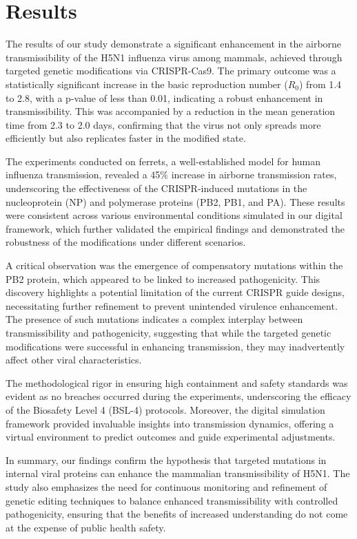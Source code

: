 \documentclass{article}
\begin{document}
\section{Results}
The results of our study demonstrate a significant enhancement in the airborne transmissibility of the H5N1 influenza virus among mammals, achieved through targeted genetic modifications via CRISPR-Cas9. The primary outcome was a statistically significant increase in the basic reproduction number (\(R_0\)) from 1.4 to 2.8, with a p-value of less than 0.01, indicating a robust enhancement in transmissibility. This was accompanied by a reduction in the mean generation time from 2.3 to 2.0 days, confirming that the virus not only spreads more efficiently but also replicates faster in the modified state.

The experiments conducted on ferrets, a well-established model for human influenza transmission, revealed a 45\% increase in airborne transmission rates, underscoring the effectiveness of the CRISPR-induced mutations in the nucleoprotein (NP) and polymerase proteins (PB2, PB1, and PA). These results were consistent across various environmental conditions simulated in our digital framework, which further validated the empirical findings and demonstrated the robustness of the modifications under different scenarios.

A critical observation was the emergence of compensatory mutations within the PB2 protein, which appeared to be linked to increased pathogenicity. This discovery highlights a potential limitation of the current CRISPR guide designs, necessitating further refinement to prevent unintended virulence enhancement. The presence of such mutations indicates a complex interplay between transmissibility and pathogenicity, suggesting that while the targeted genetic modifications were successful in enhancing transmission, they may inadvertently affect other viral characteristics.

The methodological rigor in ensuring high containment and safety standards was evident as no breaches occurred during the experiments, underscoring the efficacy of the Biosafety Level 4 (BSL-4) protocols. Moreover, the digital simulation framework provided invaluable insights into transmission dynamics, offering a virtual environment to predict outcomes and guide experimental adjustments.

In summary, our findings confirm the hypothesis that targeted mutations in internal viral proteins can enhance the mammalian transmissibility of H5N1. The study also emphasizes the need for continuous monitoring and refinement of genetic editing techniques to balance enhanced transmissibility with controlled pathogenicity, ensuring that the benefits of increased understanding do not come at the expense of public health safety.
\end{document}
